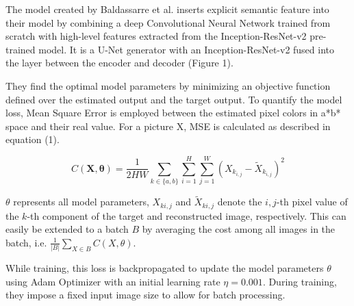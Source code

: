 \documentclass[10pt,twocolumn,letterpaper]{article}
\begin{document}
The model created by Baldassarre et al. inserts explicit semantic feature into their model by combining a deep Convolutional Neural Network trained from scratch with high-level features extracted from the Inception-ResNet-v2 pre- trained model. It is a U-Net generator with an Inception-ResNet-v2 fused into the layer between the encoder and decoder (Figure 1).

They find the optimal model parameters by minimizing an objective function defined over the estimated output and the target output. To quantify the model loss, Mean Square Error is employed between the estimated pixel colors in a*b* space and their real value. For a picture X, MSE is calculated as described in equation (1). 

\begin{equation}
C(\mathbf{X}, \boldsymbol{\theta})=\frac{1}{2 H W} \sum_{k \in\{a, b\}} \sum_{i=1}^H \sum_{j=1}^W\left(X_{k_{i, j}}-\tilde{X}_{k_{i, j}}\right)^2
\end{equation}

\(\theta\) represents all model parameters, \(X_{ki,j}\) and \(\widetilde{X}_{ki,j}\) denote the \(i,j\)-th pixel value of the \(k\)-th component of the target and reconstructed image, respectively. This can easily be extended to a batch \(B\) by averaging the cost among all images in the batch, i.e. \(\frac{1}{|B|} \sum_{X \in B} C(X, \theta)\).

While training, this loss is backpropagated to update the model parameters \(\theta\) using Adam Optimizer \cite{Kingma} with an initial learning rate \(\eta = 0.001\). During training, they impose a fixed input image size to allow for batch processing.
\end{document}
